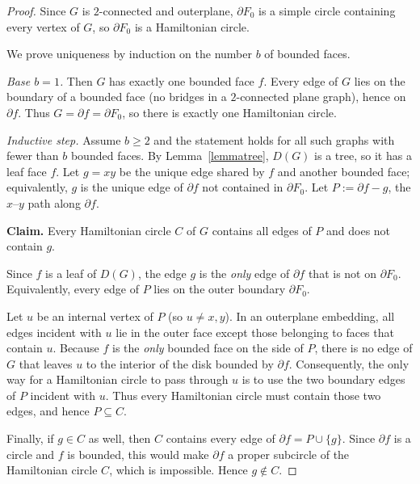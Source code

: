 \documentclass[12pt]{amsart}
\theoremstyle{theorem}%
\theoremstyle{definition}%
\begin{document}
\begin{proof}
Since $G$ is $2$-connected and outerplane, $\partial F_0$ is a simple circle containing every vertex of $G$,
so $\partial F_0$ is a Hamiltonian circle.

We prove uniqueness by induction on the number $b$ of bounded faces.

\smallskip
\noindent\emph{Base $b=1$.}
Then $G$ has exactly one bounded face $f$.
Every edge of $G$ lies on the boundary of a bounded face (no bridges in a $2$-connected plane graph), hence on $\partial f$.
Thus $G=\partial f=\partial F_0$, so there is exactly one Hamiltonian circle.

\smallskip
\noindent\emph{Inductive step.}
Assume $b\ge2$ and the statement holds for all such graphs with fewer than $b$ bounded faces.
By Lemma~\ref{lemmatree}, $D(G)$ is a tree, so it has a leaf face $f$.
Let $g=xy$ be the unique edge shared by $f$ and another bounded face; equivalently, $g$ is the unique edge of $\partial f$
not contained in $\partial F_0$.
Let $P:=\partial f - g$, the $x$--$y$ path along $\partial f$.

\medskip
\noindent\textbf{Claim.} Every Hamiltonian circle $C$ of $G$ contains all edges of $P$ and does not contain $g$.

\smallskip





\smallskip
Since $f$ is a leaf of $D(G)$, the edge $g$ is the \emph{only} edge of $\partial f$ that is not on $\partial F_0$.
Equivalently, every edge of $P$ lies on the outer boundary $\partial F_0$.

Let $u$ be an internal vertex of $P$ (so $u\neq x,y$). In an outerplane embedding, all edges incident with $u$
lie in the outer face except those belonging to faces that contain $u$. Because $f$ is the \emph{only} bounded face
on the side of $P$, there is no edge of $G$ that leaves $u$ to the interior of the disk bounded by $\partial f$.
Consequently, the only way for a Hamiltonian circle to pass through $u$ is to use the two boundary edges of $P$
incident with $u$. Thus every Hamiltonian circle must contain those two edges, and hence $P\subseteq C$.

Finally, if $g\in C$ as well, then $C$ contains every edge of $\partial f = P\cup\{g\}$.
Since $\partial f$ is a circle and $f$ is bounded, this would make $\partial f$ a proper subcircle of the Hamiltonian
circle $C$, which is impossible. Hence $g\notin C$.




\end{proof}
\end{document}
